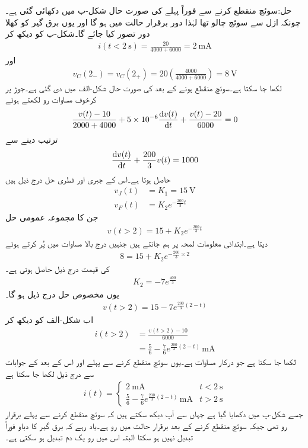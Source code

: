 حل:سوئچ منقطع کرنے سے فوراً پہلے کی صورت حال شکل-ب میں دکھائی گئی ہے۔چونکہ ازل سے سوئچ چالو تھا لہٰذا دور برقرار حالت میں ہو گا اور یوں برق گیر کو کھلا دور تصور کیا جائے گا۔شکل-ب کو دیکھ کر
\begin{align*}
i(t<\SI{2}{\second})=\frac{20}{4000+6000}=\SI{2}{\milli\ampere}
\end{align*}
اور
\begin{align*}
v_C(2_-)=v_C(2_+)=20\left(\frac{4000}{4000+6000}\right)=\SI{8}{\volt}
\end{align*}
لکھا جا سکتا ہے۔سوئچ منقطع ہونے کے بعد کی صورت حال شکل-الف میں دی گئی ہے۔جوڑ  پر کرخوف مساوات رو لکھتے ہوئے
\begin{align*}
\frac{v(t)-10}{2000+4000}+5\times 10^{-6}\frac{\dif v(t)}{\dif t}+\frac{v(t)-20}{6000}=0
\end{align*}
ترتیب دینے سے
\begin{align*}
\frac{\dif v(t)}{\dif t}+\frac{200}{3} v(t)=1000
\end{align*}
حاصل ہوتا ہے۔اس کے جبری اور فطری  حل درج ذیل ہیں
\begin{align*}
v_J(t)&=K_1=\SI{15}{\volt}\\
v_F(t)&=K_2e^{-\frac{200}{3}t}
\end{align*}
جن کا مجموعہ عمومی حل
\begin{align*}
v(t>2)=15+K_2e^{-\frac{200}{3}t}
\end{align*}
 دیتا ہے۔ابتدائی معلومات  لمحہ  پر ہم جانتے ہیں جنہیں درج بالا مساوات میں پُر کرتے ہوئے
\begin{align*}
8=15+K_2e^{-\frac{200}{3}\times 2}
\end{align*}
 کی قیمت درج ذیل حاصل ہوتی ہے۔
\begin{align*}
K_2=-7e^{\frac{400}{3}}
\end{align*}
یوں مخصوص حل درج ذیل ہو گا۔
\begin{align*}
v(t>2)=15-7e^{\frac{200}{3}(2-t)}
\end{align*}
اب شکل-الف کو دیکھ کر
\begin{align*}
i(t>2)&=\frac{v(t>2)-10}{6000}\\
&=\frac{5}{6}-\frac{7}{6} e^{\frac{200}{3}(2-t)} \, \si{\milli\ampere}
\end{align*}
لکھا جا سکتا ہے جو درکار مساوات ہے۔یوں سوئچ منقطع کرنے سے پہلے اور اس کے بعد کے جوابات سے درج ذیل لکھا جا سکتا ہے
\begin{align*}
i(t)=
\begin{cases}
\SI{2}{\milli\ampere} & t<\SI{2}{\second}\\
\frac{5}{6}-\frac{7}{6} e^{\frac{200}{3}(2-t)} \, \si{\milli\ampere} & t>\SI{2}{\second}
\end{cases}
\end{align*}
جسے شکل-پ میں دکھایا گیا ہے جہاں سے آپ دیکھ سکتے ہیں کہ سوئچ منقطع کرنے سے پہلے برقرار رو  تھی جبکہ سوئچ منقطع کرنے کے بعد برقرار حالت  میں رو  ہے۔یاد رہے کہ برق گیر کا دباو فوراً تبدیل نہیں ہو سکتا البتہ اس میں رو یک دم تبدیل ہو سکتی ہے۔

